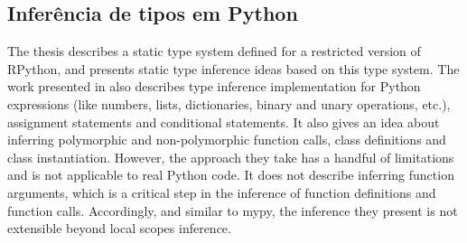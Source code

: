 \subsection{Inferência de tipos em Python \cite{porto}}
The thesis \cite{porto} describes a static type system defined for a restricted version of RPython, and presents static type inference ideas based on this type system. The work presented in \cite{porto} also describes type inference implementation for Python expressions (like numbers, lists, dictionaries, binary and
unary operations, etc.), assignment statements and conditional statements. It also gives an idea about inferring polymorphic and non-polymorphic function calls, class definitions and class instantiation. However, the approach they take has a handful of limitations and is not applicable to real Python code. It does not describe inferring function arguments, which is a critical step in the inference of function definitions and function calls. Accordingly, and similar to mypy, the inference they present is not extensible beyond local scopes inference.